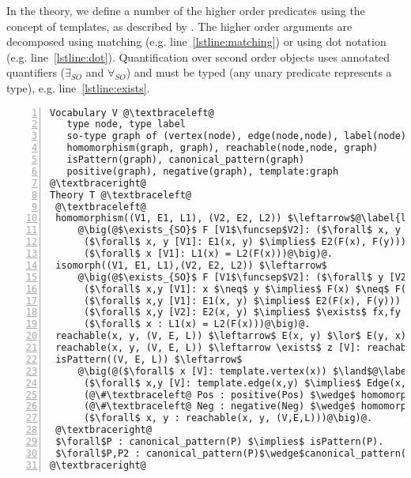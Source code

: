 In the theory, we define a number of the higher order predicates using the concept of templates, as described by \cite{DBLP:journals/tplp/DassevilleHJD15}. %
The higher order arguments are decomposed using matching (e.g. line~\ref{lstline:matching}) or using dot notation (e.g. line~\ref{lstline:dot}).
Quantification over second order objects uses annotated quantifiers ($\exists_{SO}$ and $\forall_{SO}$) and must be typed (any unary predicate represents a type), e.g. line~\ref{lstline:exists}.

\newcommand{\funcsep}[0]{:}
\begin{lstlisting}[mathescape,style=model,caption={Faithful encoding for the general graph mining problem},label=lst:faithful, numbers=left]
Vocabulary V @\textbraceleft@
   type node, type label
   so-type graph of (vertex(node), edge(node,node), label(node):label)
   homomorphism(graph, graph), reachable(node,node, graph)
   isPattern(graph), canonical_pattern(graph)
   positive(graph), negative(graph), template:graph 
@\textbraceright@ 
Theory T @\textbraceleft@ 
 @\textbraceleft@
 homomorphism((V1, E1, L1), (V2, E2, L2)) $\leftarrow$@\label{lstline:matching}@
     @\big(@$\exists_{SO}$ F [V1$\funcsep$V2]: ($\forall$ x, y [V1]: x $\neq$ y $\implies$ F(x) $\neq$ F(y)) $\wedge$@\label{lstline:exists}@
      ($\forall$ x, y [V1]: E1(x, y) $\implies$ E2(F(x), F(y))) $\wedge$
      ($\forall$ x [V1]: L1(x) = L2(F(x)))@\big)@.
 isomorph((V1, E1, L1),(V2, E2, L2)) $\leftarrow$
     @\big(@$\exists_{SO}$ F [V1$\funcsep$V2]: ($\forall$ y [V2]: $\exists$ x [V1]: F(x)=y) $\land$ 
      ($\forall$ x,y [V1]: x $\neq$ y $\implies$ F(x) $\neq$ F(y)) $\wedge$
      ($\forall$ x,y [V1]: E1(x, y) $\implies$ E2(F(x), F(y))) $\wedge$              
      ($\forall$ x,y [V2]: E2(x, y) $\implies$ $\exists$ fx,fy [V1]: E1(fx, fy) $\land$ x = F(fx) $\land$ y = F(fy))$\wedge$ 
      ($\forall$ x : L1(x) = L2(F(x)))@\big)@.
 reachable(x, y, (V, E, L)) $\leftarrow$ E(x, y) $\lor$ E(y, x).
 reachable(x, y, (V, E, L)) $\leftarrow \exists$ z [V]: reachable(x, z, (V, E, L)) $\wedge$ reachable(z, y, (V, E, L)).
 isPattern((V, E, L)) $\leftarrow$
     @\big(@($\forall$ x [V]: template.vertex(x)) $\land$@\label{lstline:dot}@
      ($\forall$ x,y [V]: template.edge(x,y) $\implies$ Edge(x,y)) $\land$ 
      (@\#\textbraceleft@ Pos : positive(Pos) $\wedge$ homomorphism((V,E,L), Pos) @\textbraceright@ $\geq$ $N_{+}$) $\land$
      (@\#\textbraceleft@ Neg : negative(Neg) $\wedge$ homomorphism((V,E,L), Neg) @\textbraceright@ $\leq$ $N_{-}$) $\land$
      ($\forall$ x, y : reachable(x, y, (V,E,L)))@\big)@. 
 @\textbraceright@
 $\forall$P : canonical_pattern(P) $\implies$ isPattern(P). 
 $\forall$P,P2 : canonical_pattern(P)$\wedge$canonical_pattern(P2)$\wedge$P$\neq$P2 $\implies$ $\neg$isomorph(P, P2).
@\textbraceright@ 
\end{lstlisting}

